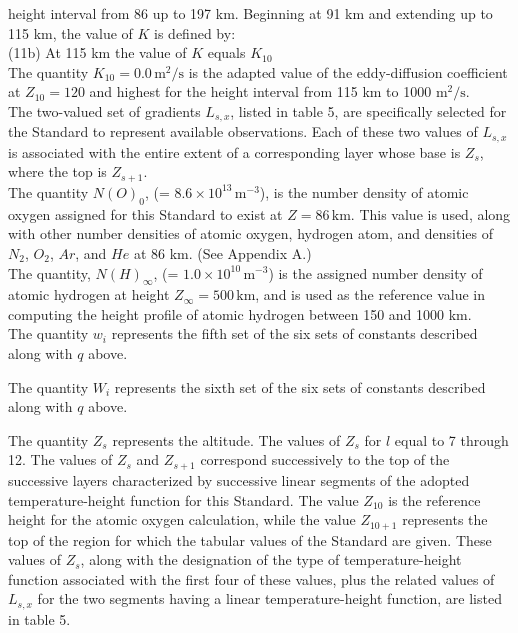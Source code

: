 \documentclass{article}
\begin{document}
height interval from 86 up to 197 km. Beginning at 91 km and extending up to 115 km, the value of $K$ is defined by:\\
(11b) At 115 km the value of $K$ equals $K_{10}$\\
The quantity $K_{10} = 0.0 \, \text{m}^2/\text{s}$ is the adapted value of the eddy-diffusion coefficient at $Z_{10} = 120$ and highest for the height interval from 115 km to 1000 $ \text{m}^2/\text{s}$.\\
The two-valued set of gradients $L_{s,x}$, listed in table 5, are specifically selected for the Standard to represent available observations. Each of these two values of $L_{s,x}$ is associated with the entire extent of a corresponding layer whose base is $Z_s$, where the top is $Z_{s+1}$.\\
The quantity $N(O)_0$, (= $8.6 \times 10^{13} \, \text{m}^{-3}$), is the number density of atomic oxygen assigned for this Standard to exist at $Z = 86 \, \text{km}$. This value is used, along with other number densities of atomic oxygen, hydrogen atom, and densities of $N_2$, $O_2$, $Ar$, and $He$ at 86 km. (See Appendix A.)\\
The quantity, $N(H)_\infty$, (= $1.0 \times 10^{10} \, \text{m}^{-3}$) is the assigned number density of atomic hydrogen at height $Z_\infty = 500 \, \text{km}$, and is used as the reference value in computing the height profile of atomic hydrogen between 150 and 1000 km.\\

The quantity $w_i$ represents the fifth set of the six sets of constants described along with $q$ above.

The quantity $W_i$ represents the sixth set of the six sets of constants described along with $q$ above.

The quantity $Z_s$ represents the altitude. The values of $Z_s$ for $l$ equal to 7 through 12. The values of $Z_s$ and $Z_{s+1}$ correspond successively to the top of the successive layers characterized by successive linear segments of the adopted temperature-height function for this Standard. The value $Z_{10}$ is the reference height for the atomic oxygen calculation, while the value $Z_{10+1}$ represents the top of the region for which the tabular values of the Standard are given. These values of $Z_s$, along with the designation of the type of temperature-height function associated with the first four of these values, plus the related values of $L_{s,x}$ for the two segments having a linear temperature-height function, are listed in table 5.
\end{document}
